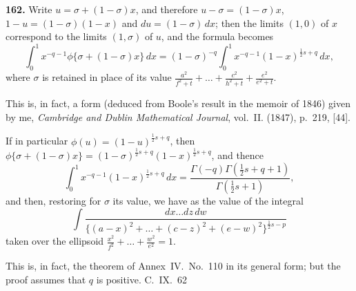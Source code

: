 \documentclass[11pt,a4paper]{article}
\begin{document}
{\medskip
\noindent\textbf{162.}
Write $u = \sigma + (1-\sigma)x$, and therefore $u-\sigma = (1-\sigma)x$, $1-u = (1-\sigma)(1-x)$ and $du = (1-\sigma)\, dx$; then the limits $(1, 0)$ of $x$ correspond to the limits $(1, \sigma)$ of $u$, and the formula becomes
\[
\int_0^1 x^{-q-1} \phi\{\sigma + (1-\sigma)x\}\, dx = (1-\sigma)^{-q} \int_0^1 x^{-q-1}(1-x)^{\frac{1}{2}s+q}\, dx,
\]
where $\sigma$ is retained in place of its value $\frac{a^2}{f^2+t} + \ldots + \frac{c^2}{h^2+t} + \frac{e^2}{e^2+t}$.

This is, in fact, a form (deduced from Boole's result in the memoir of 1846) given by me, \textit{Cambridge and Dublin Mathematical Journal}, vol.~II. (1847), p.~219, [44].

If in particular $\phi(u) = (1-u)^{\frac{1}{2}s+q}$, then $\phi\{\sigma+(1-\sigma)x\} = (1-\sigma)^{\frac{1}{2}s+q}(1-x)^{\frac{1}{2}s+q}$, and thence
\[
\int_0^1 x^{-q-1}(1-x)^{\frac{1}{2}s+q}\, dx = \frac{\Gamma(-q)\Gamma(\frac{1}{2}s+q+1)}{\Gamma(\frac{1}{2}s+1)},
\]
and then, restoring for $\sigma$ its value, we have as the value of the integral
\[
\int \frac{dx\ldots dz\, dw}{\{(a-x)^2 + \ldots + (c-z)^2 + (e-w)^2\}^{\frac{1}{2}s-p}}
\]
taken over the ellipsoid $\frac{x^2}{f^2} + \ldots + \frac{w^2}{e^2} = 1$.

This is, in fact, the theorem of Annex~IV.\ No.~110 in its general form; but the proof assumes that $q$ is positive.
\hfill C.~IX.\ 62

} %
\end{document}
